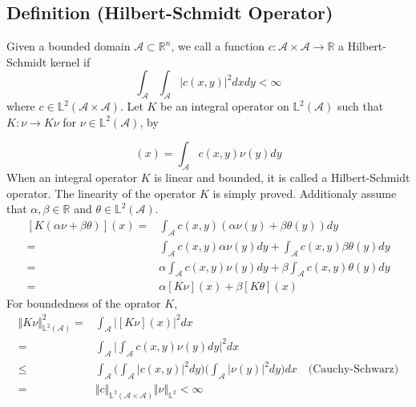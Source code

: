 \documentclass[11pt,twoside,a4paper]{article}
\begin{document}
	\subsection{Definition (Hilbert-Schmidt Operator)}\label{def_HS}
	Given a bounded domain $\mathcal{A} \subset \mathbb{R}^n$, we call a function $c : \mathcal{A} \times \mathcal{A} \rightarrow \mathbb{R}$ a Hilbert-Schmidt kernel if
	\begin{equation}
		\int_{\mathcal{A}} \int_{\mathcal{A}} \vert c(x,y) \vert ^2 dx dy < \infty
	\end{equation}
	where $c \in \mathbb{L}^2(\mathcal{A} \times \mathcal{A})$. Let $K$ be an integral operator on $\mathbb{L}^2(\mathcal{A})$ such that $K : \nu \rightarrow K \nu$ for $\nu \in \mathbb{L}^2(\mathcal{A})$, by
	
	\begin{equation}
		[K\nu](x) = \int_{\mathcal{A}} c(x,y) \nu(y) dy
	\end{equation}
	When an integral operator $K$ is linear and bounded, it is called a Hilbert-Schmidt operator. The linearity of the operator $K$ is simply proved. Additionaly assume that $\alpha, \beta \in \mathbb{R}$ and $\theta \in \mathbb{L}^2(\mathcal{A})$.
	\begin{equation}
		\begin{split}
			[K (\alpha \nu + \beta \theta)](x) =& \int_{\mathcal{A}} c(x,y)(\alpha \nu(y) + \beta \theta(y)) dy\\
			= & \int_{\mathcal{A}} c(x,y) \alpha \nu(y) dy + \int_{\mathcal{A}} c(x,y) \beta \theta(y) dy\\
			= & \alpha\int_{\mathcal{A}} c(x,y) \nu (y) dy + \beta\int_{\mathcal{A}} c(x,y) \theta (y) dy\\
			= & \alpha[K\nu](x) + \beta[K\theta](x)
		\end{split}
	\end{equation}
	For boundedness of the oprator $K$,
	\begin{equation}
		\begin{split}
			\Vert K\nu \Vert^{2}_{\mathbb{L}^2(\mathcal{A})} = & \int_{\mathcal{A}} \biggl\vert [K\nu](x) \biggr\vert^2 dx\\
			= &\int_{\mathcal{A}} \biggl\vert \int_{\mathcal{A}}c(x,y)\nu(y)dy \biggr\vert^2dx\\
			\leq & \int_{\mathcal{A}}\biggl(\int_{\mathcal{A}}\vert c(x,y) \vert^2dy\biggr) \biggl(\int_{\mathcal{A}}\vert \nu(y) \vert ^2 dy \biggr)dx \quad \text{(Cauchy-Schwarz)}\\
			= & \Vert c \Vert_{\mathbb{L}^2(\mathcal{A} \times \mathcal{A})}\Vert \nu \Vert_{\mathbb{L}^2} < \infty
		\end{split}
	\end{equation}
	
\end{document}

